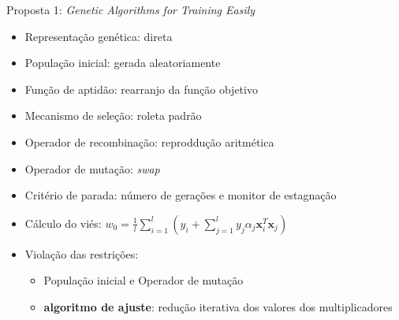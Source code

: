 \documentclass{beamer}
\begin{document}
\begin{frame}{Proposta 1: \textit{Genetic Algorithms for Training Easily}}
  \begin{itemize}
    \item Representação genética: direta
    \item População inicial: gerada aleatoriamente
    \item Função de aptidão: rearranjo da função objetivo
    \item Mecanismo de seleção: roleta padrão
    \item Operador de recombinação: reproddução aritmética
    \item Operador de mutação: \textit{swap}
    \item Critério de parada: número de gerações e monitor de estagnação
    \item Cálculo do viés: $w_0 = \frac{1}{l}\sum_{i=1}^{l}\left(y_{i} + \sum_{j=1}^{l}y_{j}\alpha_{j}\mathbf{x}_{i}^{T}\mathbf{x}_{j} \right )$
    \item Violação das restrições:
    \begin{itemize}
      \item População inicial e Operador de mutação
      \item \textbf{algoritmo de ajuste}: redução iterativa dos valores dos multiplicadores
    \end{itemize}
    
  \end{itemize}
\end{frame}
\end{document}
